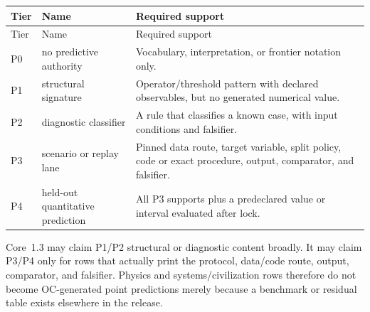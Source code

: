 \begin{longtable}{@{}p{}p{}p{}@{}}
\toprule
Tier & Name & Required support \\
\midrule
\endfirsthead
\toprule
Tier & Name & Required support \\
\midrule
\endhead
P0 & no predictive authority & Vocabulary, interpretation, or frontier notation only. \\
P1 & structural signature & Operator/threshold pattern with declared observables, but no generated numerical value. \\
P2 & diagnostic classifier & A rule that classifies a known case, with input conditions and falsifier. \\
P3 & scenario or replay lane & Pinned data route, target variable, split policy, code or exact procedure, output, comparator, and falsifier. \\
P4 & held-out quantitative prediction & All P3 supports plus a predeclared value or interval evaluated after lock. \\
\bottomrule
\end{longtable}

Core~1.3 may claim P1/P2 structural or diagnostic content broadly. It may claim
P3/P4 only for rows that actually print the protocol, data/code route, output,
comparator, and falsifier. Physics and systems/civilization rows therefore do
not become OC-generated point predictions merely because a benchmark or
residual table exists elsewhere in the release.
